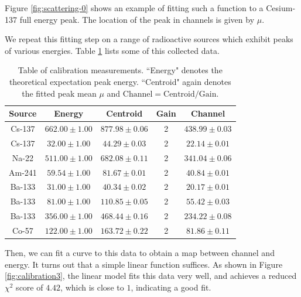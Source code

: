 \documentclass[12pt, letterpaper]{article}
\begin{document}
Figure \ref{fig:scattering-0} shows an example of fitting such a function to a Cesium-137 full energy peak. The location of the peak in channels is given by $\mu$. 

We repeat this fitting step on a range of radioactive sources which exhibit peaks of various energies. Table \ref{table:calibration3} lists some of this collected data. 

\begin{table}[!h]
\footnotesize
\centering
\begin{tabular}{| c c | c c | c |}
    \hline
    Source & Energy & Centroid & Gain & \textbf{Channel} \\
    \hline
    Cs-137 & $662.00 \pm 1.00$ & $877.98 \pm 0.06$ & 2 & $438.99 \pm 0.03$\\
    Cs-137 & $32.00 \pm 1.00$ & $44.29 \pm 0.03$ & 2 & $22.14 \pm 0.01$\\
    Na-22 & $511.00 \pm 1.00$ & $682.08 \pm 0.11$ & 2 & $341.04 \pm 0.06$ \\
    Am-241 & $59.54 \pm 1.00$ & $81.67 \pm 0.01$ & 2 & $40.84 \pm 0.01$ \\
    Ba-133 & $31.00 \pm 1.00$ & $40.34 \pm 0.02$ & 2 & $20.17 \pm 0.01$ \\
    Ba-133 & $81.00 \pm 1.00$ & $110.85 \pm 0.05$ & 2 & $55.42 \pm 0.03$ \\
    Ba-133 & $356.00 \pm 1.00$ & $468.44 \pm 0.16$ & 2 & $234.22 \pm 0.08$ \\
    Co-57 & $122.00 \pm 1.00$ & $163.72 \pm 0.22$ & 2 & $81.86 \pm 0.11$ \\
    \hline
\end{tabular}
\caption{
    Table of calibration measurements. ``Energy" denotes the theoretical expectation peak energy. ``Centroid" again denotes the fitted peak mean $\mu$ and $\text{Channel}=\text{Centroid}/\text{Gain}$. 
}
\label{table:calibration3}
\end{table}

Then, we can fit a curve to this data to obtain a map between channel and energy. It turns out that a simple linear function suffices. As shown in Figure \ref{fig:calibration3}, the linear model fits this data very well, and achieves a reduced $\chi^2$ score of $4.42$, which is close to $1$, indicating a good fit. 
\end{document}

